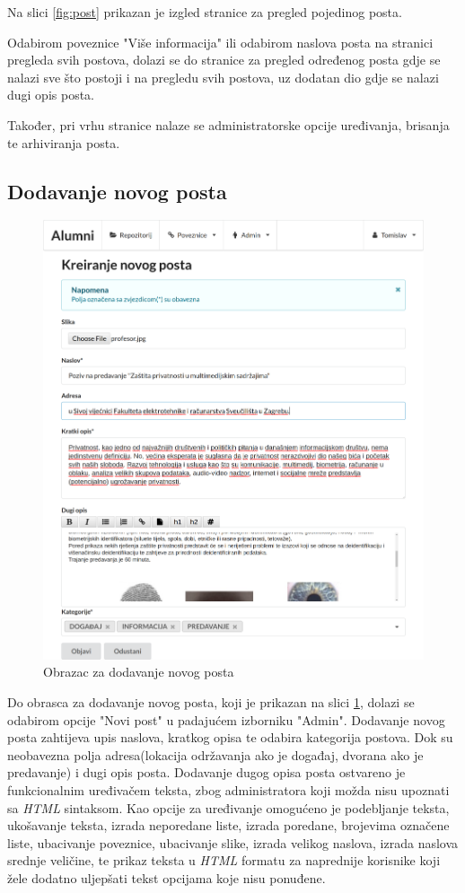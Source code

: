 \documentclass[zavrsni, numeric]{fer}
\begin{document}
Na slici \ref{fig:post} prikazan je izgled stranice za pregled pojedinog posta.

Odabirom poveznice "Više informacija" ili odabirom naslova posta na stranici pregleda svih postova, dolazi se do stranice za pregled određenog posta gdje se nalazi sve što postoji i na pregledu svih postova, uz dodatan dio gdje se nalazi dugi opis posta.

Također, pri vrhu stranice nalaze se administratorske opcije uređivanja, brisanja te arhiviranja posta.
 
\subsection{Dodavanje novog posta}

\begin{figure}[H]
	\centering
	\includegraphics[width=13cm]{slike/novi-post.png}
	\caption{Obrazac za dodavanje novog posta}
	\label{fig:novi-post}
\end{figure}

Do obrasca za dodavanje novog posta, koji je prikazan na slici \ref{fig:novi-post}, dolazi se odabirom opcije "Novi post" u padajućem izborniku "Admin". Dodavanje novog posta zahtijeva upis naslova, kratkog opisa te odabira kategorija postova. Dok su neobavezna polja adresa(lokacija održavanja ako je događaj, dvorana ako je predavanje) i dugi opis posta. Dodavanje dugog opisa posta ostvareno je funkcionalnim uređivačem teksta, zbog administratora koji možda nisu upoznati sa \textit{HTML} sintaksom. Kao opcije za uređivanje omogućeno je podebljanje teksta, ukošavanje teksta, izrada neporedane liste, izrada poredane, brojevima označene liste, ubacivanje poveznice, ubacivanje slike, izrada velikog naslova, izrada naslova srednje veličine, te prikaz teksta u \textit{HTML} formatu za naprednije korisnike koji žele dodatno uljepšati tekst opcijama koje nisu ponuđene.
\end{document}
